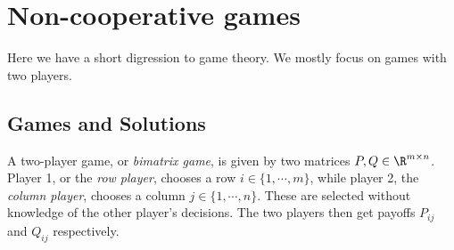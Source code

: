 \documentclass[a4paper]{article}
\begin{document}
\section{Non-cooperative games}
Here we have a short digression to game theory. We mostly focus on games with two players.

\subsection{Games and Solutions}
\begin{defi}
  A two-player game, or \emph{bimatrix game}, is given by two matrices $P, Q\in \R^{m\times n}$. Player 1, or the \emph{row player}, chooses a row $i\in \{1, \cdots, m\}$, while player 2, the \emph{column player}, chooses a column $j\in \{1, \cdots, n\}$. These are selected without knowledge of the other player's decisions. The two players then get payoffs $P_{ij}$ and $Q_{ij}$ respectively.
\end{defi}
\end{document}
